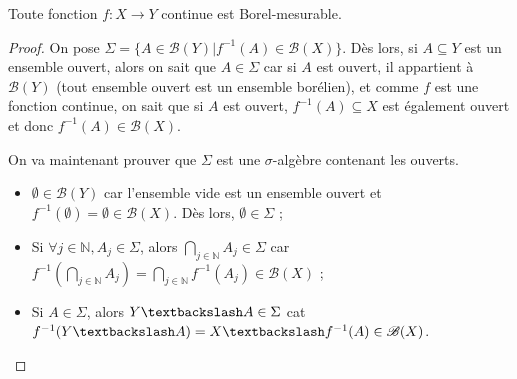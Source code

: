 \begin{theo}
    Toute fonction $f:X\to Y$ continue est Borel-mesurable.
\end{theo}
\begin{proof}
    On pose $\Sigma = \{A\in\mathscr{B}(Y)\big|f^{-1}(A)\in\mathscr{B}(X)\}$. Dès lors, si $A\subseteq Y$ est un ensemble ouvert, alors on sait que $A\in\Sigma$ car si $A$ est ouvert, il appartient à $\mathscr{B}(Y)$ (tout ensemble ouvert est un ensemble borélien), et comme $f$ est une fonction continue, on sait que si $A$ est ouvert, $f^{-1}(A)\subseteq X$ est également ouvert et donc $f^{-1}(A) \in\mathscr{B}(X)$.
    
    On va maintenant prouver que $\Sigma$ est une $\sigma$-algèbre contenant les ouverts.
    \begin{itemize}
        \item $\emptyset\in\mathscr{B}(Y)$ car l'ensemble vide est un ensemble ouvert et $f^{-1}(\emptyset)=\emptyset\in\mathscr{B}(X)$. Dès lors, $\emptyset \in\Sigma$ ;
        \item Si $\forall j\in\mathbb{N},A_j\in\Sigma$, alors $\bigcap_{j\in\mathbb{N}}A_j\in\Sigma$ car $f^{-1}\left(\bigcap_{j\in\mathbb{N}}A_j\right) = \bigcap_{j\in\mathbb{N}}f^{-1}(A_j)\in\mathscr{B}(X)$ ;
        \item Si $A\in\Sigma$, alors $Y\textbackslash A\in\Sigma$ cat $f^{-1}(Y\textbackslash A)=X\textbackslash f^{-1}(A)\in\mathscr{B}(X)$.
    \end{itemize}
\end{proof}

